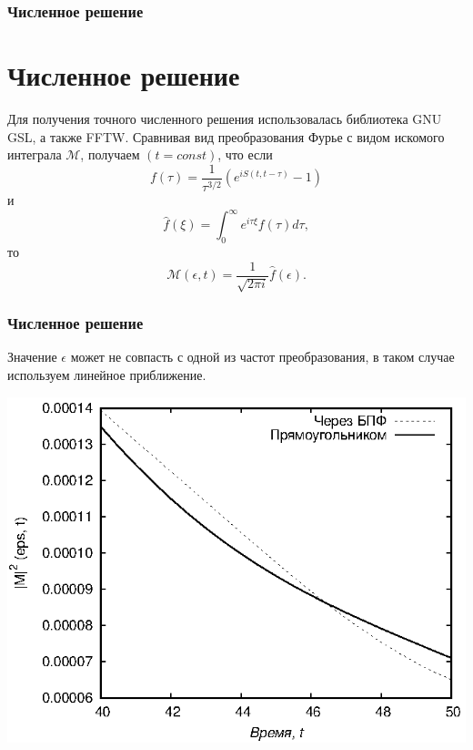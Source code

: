 \documentclass{beamer}
\newcommand{\cM}{\mathcal{M}}
\begin{document}
\frame
{	
	\frametitle{Численное решение}
	\section{Численное решение}
	Для получения точного численного решения использовалась библиотека GNU GSL, а также FFTW.
	Сравнивая вид преобразования Фурье с видом искомого интеграла $\cM$, получаем $(t = const)$, что если
	$$ 
	f(\tau) = \frac{1}{{\tau}^{3/2}}(e^{i S(t, t-\tau)} - 1)
	$$
	и
	$$
	\hat{f}(\xi) = \int_{0}^{\infty} e^{i \tau \xi} f(\tau) d\tau,
	$$
	то
	$$
	\cM(\epsilon,t)=\frac{1}{\sqrt{2\pi i}} \hat{f}(\epsilon).
	$$	
}

\frame
{
	\frametitle{Численное решение}	
	Значение $\epsilon$ может не совпасть с одной из частот преобразования, в таком случае используем линейное приближение.
	
	\begin{center}
		\includegraphics{fftw_compare_nofftw2}  
	\end{center}	
}
\end{document}
